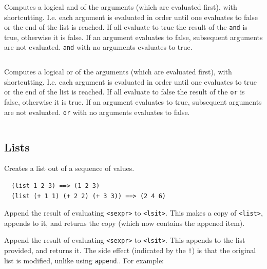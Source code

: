 \documentclass[12pt]{article}
\begin{document}
Computes a logical and of the arguments (which are evaluated first),
with shortcutting. I.e. each argument is evaluated in order until one
evaluates to false or the end of the list is reached. If all evaluate
to true the result of the \verb|and| is true, otherwise it is false.
If an argument evaluates to false, subsequent arguments are not
evaluated. \verb|and| with no arguments evaluates to true.

\begin{verbatim}

\end{verbatim}


Computes a logical or of the arguments (which are evaluated first),
with shortcutting. I.e. each argument is evaluated in order until one
evaluates to true or the end of the list is reached. If all evaluate
to false the result of the \verb|or| is false, otherwise it is true.
If an argument evaluates to true, subsequent arguments are not
evaluated. \verb|or| with no arguments evaluates to false.

\begin{verbatim}

\end{verbatim}

\subsection{Lists}


Creates a list out of a sequence of values.

\begin{verbatim}
  (list 1 2 3) ==> (1 2 3)
  (list (+ 1 1) (+ 2 2) (+ 3 3)) ==> (2 4 6)
\end{verbatim}


Append the result of evaluating \verb|<sexpr>| to \verb|<lsit>|. This
makes a copy of \verb|<list>|, appends to it, and returns the copy
(which now contains the appened item).


Append the result of evaluating \verb|<sexpr>| to \verb|<lsit>|. This
appends to the list provided, and returns it. The side effect
(indicated by the \verb|!|) is that the original list is modified,
unlike using \verb|append|..
For example:
\end{document}
